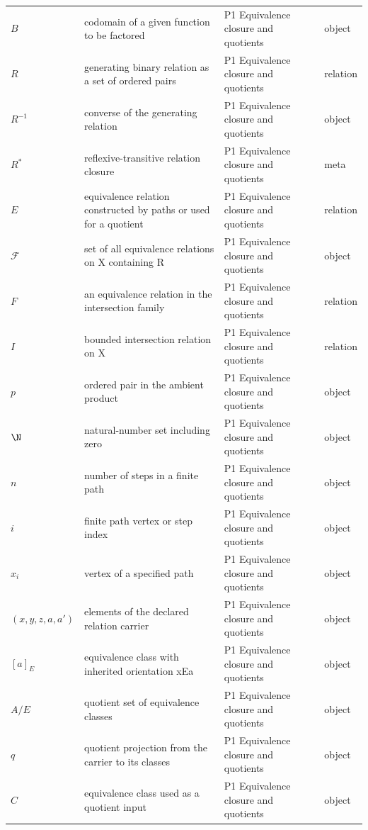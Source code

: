 \begin{longtable}{@{}p{}p{}p{}p{}@{}}
\(B\) & codomain of a given function to be factored & P1 Equivalence closure and quotients & object \\
\(R\) & generating binary relation as a set of ordered pairs & P1 Equivalence closure and quotients & relation \\
\(R^{-1}\) & converse of the generating relation & P1 Equivalence closure and quotients & object \\
\(R^*\) & reflexive-transitive relation closure & P1 Equivalence closure and quotients & meta \\
\(E\) & equivalence relation constructed by paths or used for a quotient & P1 Equivalence closure and quotients & relation \\
\(\mathcal F\) & set of all equivalence relations on X containing R & P1 Equivalence closure and quotients & object \\
\(F\) & an equivalence relation in the intersection family & P1 Equivalence closure and quotients & relation \\
\(I\) & bounded intersection relation on X & P1 Equivalence closure and quotients & relation \\
\(p\) & ordered pair in the ambient product & P1 Equivalence closure and quotients & object \\
\(\N\) & natural-number set including zero & P1 Equivalence closure and quotients & object \\
\(n\) & number of steps in a finite path & P1 Equivalence closure and quotients & object \\
\(i\) & finite path vertex or step index & P1 Equivalence closure and quotients & object \\
\(x_i\) & vertex of a specified path & P1 Equivalence closure and quotients & object \\
\((x,\allowbreak y,\allowbreak z,\allowbreak a,\allowbreak a')\) & elements of the declared relation carrier & P1 Equivalence closure and quotients & object \\
\([a]_E\) & equivalence class with inherited orientation xEa & P1 Equivalence closure and quotients & object \\
\(A/E\) & quotient set of equivalence classes & P1 Equivalence closure and quotients & object \\
\(q\) & quotient projection from the carrier to its classes & P1 Equivalence closure and quotients & object \\
\(C\) & equivalence class used as a quotient input & P1 Equivalence closure and quotients & object \\

\end{longtable}
